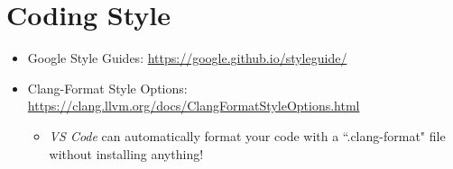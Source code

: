 \documentclass{article}
\begin{document}
\section{Coding Style}
\begin{itemize}
    \item Google Style Guides:
    \href{https://google.github.io/styleguide/}{https://google.github.io/styleguide/}
    \item Clang-Format Style Options:
    \href{https://clang.llvm.org/docs/ClangFormatStyleOptions.html}{https://clang.llvm.org/docs/ClangFormatStyleOptions.html}
    \begin{itemize}
        \item \emph{VS Code} can automatically format your code with a ``.clang-format" file without installing anything!
    \end{itemize}
\end{itemize}
\end{document}
